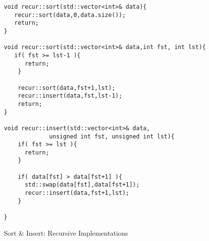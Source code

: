 \documentclass[nobib]{tufte-handout}
\begin{document}
\begin{figure}
\begin{lstlisting}
void recur::sort(std::vector<int>& data){
   recur::sort(data,0,data.size());
   return;
}

void recur::sort(std::vector<int>& data,int fst, int lst){
   if( fst >= lst-1 ){
      return;
    }

    recur::sort(data,fst+1,lst);
    recur::insert(data,fst,lst-1);
    return;
}

void recur::insert(std::vector<int>& data,
		     unsigned int fst, unsigned int lst){
    if( fst >= lst ){
      return;
    }

    if( data[fst] > data[fst+1] ){
      std::swap(data[fst],data[fst+1]);
      recur::insert(data,fst+1,lst);
    }

}
\end{lstlisting}
\label{code:isortrec}
\caption{Sort \& Insert: Recursive Implementations}
\end{figure}
\end{document}
